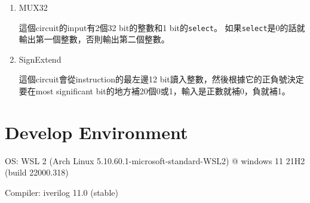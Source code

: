\documentclass{article}
\begin{document}
\begin{enumerate}
    \item MUX32

          這個circuit的input有2個32 bit的整數和1 bit的\texttt{select}。
          如果\texttt{select}是0的話就輸出第一個整數，否則輸出第二個整數。

    \item Sign\textunderscore Extend

          這個circuit會從instruction的最左邊12 bit讀入整數，然後根據它的正負號決定
          要在most significant bit的地方補20個0或1，輸入是正數就補0，負就補1。
\end{enumerate}

\section*{Develop Environment}

OS: WSL 2 (Arch Linux 5.10.60.1-microsoft-standard-WSL2) @ windows 11 21H2 (build 22000.318)

Compiler: iverilog 11.0 (stable)
\end{document}
